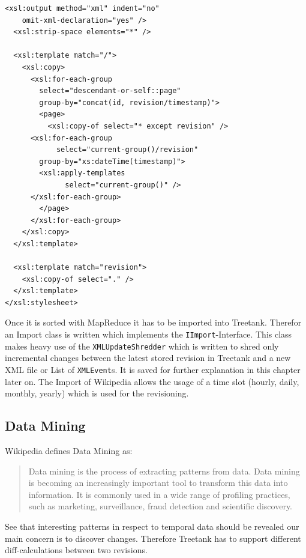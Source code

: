 \begin{enumerate}
\begin{lstlisting}[caption=XSLT stylesheet to combine consecutive pages/revisions]
  <xsl:output method="xml" indent="no" 
    omit-xml-declaration="yes" />
  <xsl:strip-space elements="*" />

  <xsl:template match="/">
    <xsl:copy>
      <xsl:for-each-group 
        select="descendant-or-self::page" 
        group-by="concat(id, revision/timestamp)">
        <page>
          <xsl:copy-of select="* except revision" />
	  <xsl:for-each-group 
            select="current-group()/revision"
	    group-by="xs:dateTime(timestamp)">
	    <xsl:apply-templates 
              select="current-group()" />
	  </xsl:for-each-group>
        </page>
      </xsl:for-each-group>
    </xsl:copy>
  </xsl:template>

  <xsl:template match="revision">
    <xsl:copy-of select="." />
  </xsl:template>
</xsl:stylesheet>
\end{lstlisting}
\label{combine}
\end{enumerate}

Once it is sorted with MapReduce it has to be imported into Treetank. Therefor an Import class is written which implements the \texttt{IImport}-Interface. This class makes heavy use of the \texttt{XMLUpdateShredder} which is written to shred only incremental changes between the latest stored revision in Treetank and a new XML file or List of \texttt{XMLEvent}s. It is saved for further explanation in this chapter later on. The Import of Wikipedia allows the usage of a time slot (hourly, daily, monthly, yearly) which is used for the revisioning.


\subsection{Data Mining}
Wikipedia defines Data Mining as:

\begin{quote}
Data mining is the process of extracting patterns from data. Data mining is becoming an increasingly important tool to transform this data into information. It is commonly used in a wide range of profiling practices, such as marketing, surveillance, fraud detection and scientific discovery.
\end{quote}

See that interesting patterns in respect to temporal data should be revealed our main concern is to discover changes. Therefore Treetank has to support different diff-calculations between two revisions.

